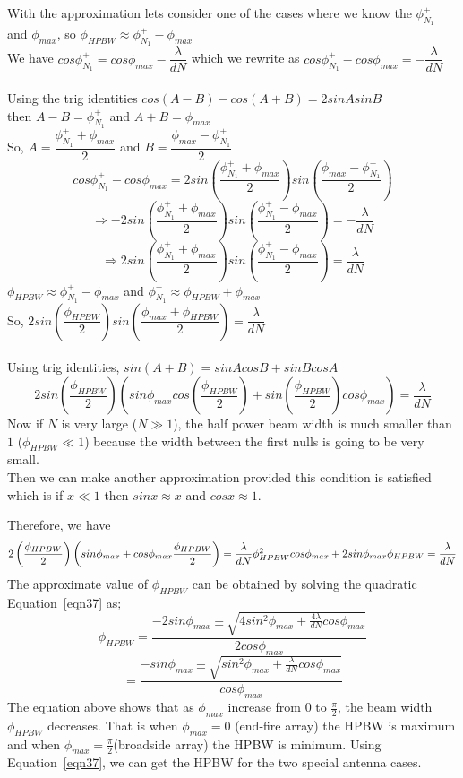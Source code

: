 With the approximation lets consider one of the cases where we know the $\phi_{N_1}^{+}$ and $\phi_{max}$, so $\phi_{HPBW} \approx \phi_{N_1}^{+} - \phi_{max} $ \\ 
We have $cos\phi_{N_1}^{+} = cos\phi_{max} - \dfrac{\lambda}{dN}$ which we rewrite as $cos\phi_{N_1}^{+} - cos\phi_{max} = - \dfrac{\lambda}{dN}$ \\ \\
Using the trig identities $cos(A - B) -cos(A + B) = 2sinAsinB$ \\ 
then $A - B = \phi_{N_1}^{+}$ and  $A + B = \phi_{max}$ \\ 
So, $ A = \dfrac{\phi_{N_1}^{+} + \phi_{max}}{2}$ and $B =  \dfrac{\phi_{max} - \phi_{N_1}^{+}}{2} $
$$cos\phi_{N_1}^{+} - cos\phi_{max} = 2sin (\dfrac{\phi_{N_1}^{+} + \phi_{max}}{2}) sin(\dfrac{\phi_{max} - \phi_{N_1}^{+}}{2})$$
$$ \Rightarrow  -2sin (\dfrac{\phi_{N_1}^{+} + \phi_{max}}{2}) sin(\dfrac{\phi_{N_1}^{+} - \phi_{max}}{2}) = - \dfrac{\lambda}{dN}$$ 
$$ \Rightarrow  2sin (\dfrac{\phi_{N_1}^{+} + \phi_{max}}{2}) sin(\dfrac{\phi_{N_1}^{+} - \phi_{max}}{2}) =  \dfrac{\lambda}{dN}$$
$\phi_{HPBW} \approx \phi_{N_1}^{+} - \phi_{max} $ and $\phi_{N_1}^{+} \approx \phi_{HPBW} + \phi_{max}$ \\
So, $2sin(\dfrac{\phi_{HPBW}}{2})sin(\dfrac{\phi_{max} + \phi_{HPBW}}{2}) = \dfrac{\lambda}{dN}$ \\ \\
Using trig identities, $sin(A+B) = sinAcosB + sinBcosA $ 
$$ 2sin(\dfrac{\phi_{HPBW}}{2})(sin\phi_{max}cos(\dfrac{\phi_{HPBW}}{2}) + sin(\dfrac{\phi_{HPBW}}{2})cos\phi_{max}) = \dfrac{\lambda}{dN} $$
Now if $N$ is very large ($N \gg 1$), the half power beam width is much smaller than $1$ ($\phi_{HPBW} \ll 1$) because the width between the first nulls is going to be very small. \\
Then we can make another approximation provided this condition is satisfied which is if  $x\ll1$ then $sinx \approx x$ and $cos x \approx 1$.

Therefore, we have 
\begin{equation}
2\left(\dfrac{\phi_{HPBW}}{2}\right)\left(sin\phi_{max} + cos\phi_{max}\dfrac{\phi_{HPBW}}{2}\right) = \dfrac{\lambda}{dN}$$ 
$$ \phi^2_{HPBW}cos\phi_{max} + 2sin\phi_{max}\phi_{HPBW} = \dfrac{\lambda}{dN}
\label{eqn37}
\end{equation}
The approximate value of $\phi_{HPBW}$ can be obtained by solving the quadratic Equation~\ref{eqn37} as;
$$ \phi_{HPBW} = \dfrac{-2sin\phi_{max}\pm\sqrt{4sin^2\phi_{max} + \frac{4\lambda}{dN}cos\phi_{max}}}{2cos\phi_{max}}$$
$$ = \dfrac{-sin\phi_{max}\pm\sqrt{sin^2\phi_{max} + \frac{\lambda}{dN}cos\phi_{max}}}{cos\phi_{max}} $$
The equation above shows that as $\phi_{max}$ increase from $0$ to $\frac{\pi}{2}$, the beam width $\phi_{HPBW}$ decreases. That is when $\phi_{max} = 0$ (end-fire array) the HPBW is maximum and when $\phi_{max} = \frac{\pi}{2}$(broadside array) the HPBW  is minimum. Using Equation~\ref{eqn37}, we can get the HPBW for the two special antenna cases. 


